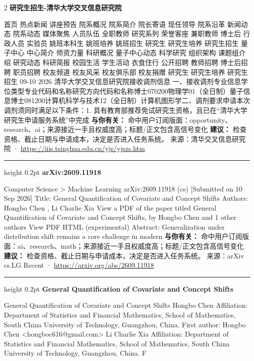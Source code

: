 \documentclass[10.5pt]{ctexart}
\begin{document}
\begin{multicols}{2}
{\large\bfseries 研究生招生-清华大学交叉信息研究院}\par
首页 热点新闻 讲座预告 院系概况 院系简介 院长寄语 现任领导 院系沿革 新闻动态 院系动态 媒体聚焦 人员队伍 全职教师 研究系列 荣誉客座 兼职教师 博士后 行政人员 实验员 姚班本科生 姚班培养 姚班招生 研究生 研究生培养 研究生招生 量子中心 中心简介 师资力量 科研概况 量子中心动态 科学研究 组织架构 课题组介绍 研究动态 科研简报 校园生活 学生活动 衣食住行 公开招聘 教师招聘 博士后招聘 职员招聘 校友频道 校友风采 校友俱乐部 校友捐赠 研究生 研究生培养 研究生招生 09-10 2026 清华大学交叉信息研究院接收调剂信息 一、接收调剂专业信息学位类型专业代码和名称研究方向代码和名称博士070200物理学01（全日制）量子信息博士081200计算机科学与技术12（全日制）计算机图形学二、调剂要求申请本次调剂须同时满足以下条件：1. 具有教育部推荐免试研究生资格，且已在“清华大学研究生申请服务系统”中完成
\textbf{与你有关：} 命中用户订阅版面：opportunity、research、ai；来源接近一手且权威度高；标题/正文包含高信号变化
\textbf{建议：} 检查资格、截止日期与申请成本，决定是否进入任务系统。
{\footnotesize\color{ormuted} 来源：清华交叉信息研究院 · \url{https://iiis.tsinghua.edu.cn/yjs/yjszs.htm}}
\vspace{2mm}
\hrule height 0.2pt
\vspace{2mm}
{\large\bfseries arXiv:2609.11918}\par
Computer Science > Machine Learning arXiv:2609.11918 (cs) [Submitted on 10 Sep 2026] Title: General Quantification of Covariate and Concept Shifts Authors: Hongbo Chen , Li Charlie Xia View a PDF of the paper titled General Quantification of Covariate and Concept Shifts, by Hongbo Chen and 1 other authors View PDF HTML (experimental) Abstract: Generalization under distribution shift remains a core challenge in modern
\textbf{与你有关：} 命中用户订阅版面：ai、research、math；来源接近一手且权威度高；标题/正文包含高信号变化
\textbf{建议：} 检查资格、截止日期与申请成本，决定是否进入任务系统。
{\footnotesize\color{ormuted} 来源：arXiv cs.LG Recent · \url{https://arxiv.org/abs/2609.11918}}
\vspace{2mm}
\hrule height 0.2pt
\vspace{2mm}
{\large\bfseries General Quantification of Covariate and Concept Shifts}\par
General Quantification of Covariate and Concept Shifts Hongbo Chen Affiliation: Department of Statistics and Financial Mathematics, School of Mathematics, South China University of Technology, Guangzhou, China. First author: Hongbo Chen <hongboc616@gmail.com> Li Charlie Xia Affiliation: Department of Statistics and Financial Mathematics, School of Mathematics, South China University of Technology, Guangzhou, China. F

\end{multicols}
\end{document}
